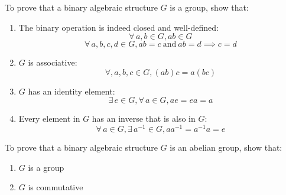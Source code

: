 \documentclass[letterpaper,12pt,fleqn]{article}
\begin{document}
To prove that a binary algebraic structure $G$ is a group, show that:
\begin{enumerate}
\item The binary operation is indeed closed and well-defined:
  \[\forall\,a,b\in G,ab\in G\]
  \[\forall\,a,b,c,d\in G,ab=c\ \mbox{and}\ ab=d\implies c=d\]
  
\item $G$ is associative:
  \[\forall,a,b,c\in G,(ab)c=a(bc)\]

\item $G$ has an identity element:
  \[\exists\,e\in G,\forall\,a\in G,ae=ea=a\]

\item Every element in $G$ has an inverse that is also in $G$:
  \[\forall\,a\in G,\exists\,a^{-1}\in G,aa^{-1}=a^{-1}a=e\]
\end{enumerate}
\newpage
To prove that a binary algebraic structure $G$ is an abelian group, show that:
\begin{enumerate}
\item $G$ is a group
\item $G$ is commutative
\end{enumerate}
\end{document}
